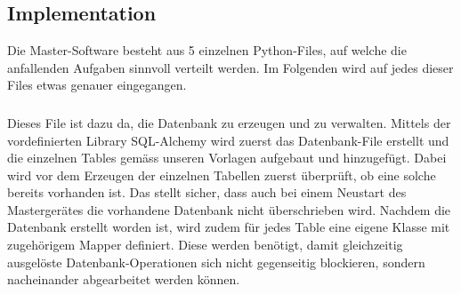 \subsection{Implementation}
\label{subsec:software:master:implementation}

Die  Master-Software besteht  aus  5 einzelnen  Python-Files,  auf welche  die
anfallenden  Aufgaben sinnvoll  verteilt werden. Im  Folgenden wird  auf jedes
dieser Files etwas genauer eingegangen.


\subsubsection{}
\label{subsubsec:software:master:implementation:database}

Dieses File ist  dazu da, die Datenbank zu erzeugen  und zu verwalten. Mittels
der  vordefinierten   Library  SQL-Alchemy  wird  zuerst   das  Datenbank-File
erstellt  und die  einzelnen Tables  gem\"ass unseren  Vorlagen aufgebaut  und
hinzugef\"ugt. Dabei  wird  vor dem  Erzeugen  der  einzelnen Tabellen  zuerst
\"uberpr\"uft, ob eine  solche bereits vorhanden ist. Das  stellt sicher, dass
auch bei  einem Neustart  des Masterger\"ates  die vorhandene  Datenbank nicht
\"uberschrieben wird. Nachdem  die Datenbank  erstellt worden ist,  wird zudem
f\"ur jedes Table eine eigene Klasse mit zugeh\"origem Mapper definiert. Diese
werden  ben\"otigt,  damit   gleichzeitig  ausgel\"oste  Datenbank-Operationen
sich nicht  gegenseitig blockieren,  sondern nacheinander  abgearbeitet werden
k\"onnen.


